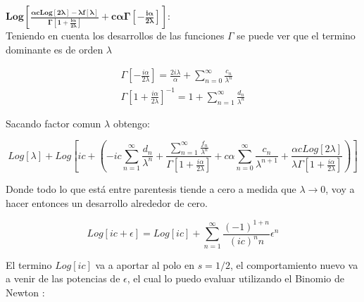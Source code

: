 $\mathbf{
Log[
	\frac{\alpha c Log[2 \lambda] - \lambda f[\lambda] }{\Gamma \left[1 + \frac{i \alpha}{ 2 \lambda} \right] } + 
	c \alpha \Gamma \left[ - \frac{i \alpha}{2 \lambda} \right] ] :
}$ \\

Teniendo en cuenta los desarrollos de las funciones $\Gamma$ se puede ver que el termino dominante es de orden $\lambda$


\begin{equation}
\begin{array}{c}
\Gamma [- \frac{i \alpha}{2 \lambda}] = 
\frac{2 i \lambda}{\alpha}  + 
\sum _{n=0} ^{\infty} \frac{c _n}{\lambda ^n} \\
\Gamma \left[ 1 + \frac{i \alpha}{2 \lambda} \right] ^{-1} = 1 + 
\sum _{n=1} ^{\infty} \frac{d _n}{\lambda ^n}
\end{array}
\end{equation}

Sacando factor comun $\lambda$ obtengo:

\begin{equation}
Log[\lambda] + 
Log \left[
	 i  c +
	\left(
		- i c \sum _{n=1} ^{\infty} \frac{d _n}{\lambda ^n} +
		\frac{\sum _{n=1} ^{\infty} \frac{f _n}{\lambda ^n}}
			 {\Gamma[1+ \frac{i \alpha}{2 \lambda}]}		
		+ c \alpha \sum _{n=0} ^{\infty} \frac{c _n}{\lambda ^{n+1}} +
		\frac{\alpha c Log[2 \lambda]}{\lambda \Gamma [1 + \frac{i \alpha}{2 \lambda} ]}	
		\right)
		\right]		
\end{equation}


Donde todo lo que está entre parentesis tiende a cero a medida que $\lambda \rightarrow 0$, voy a hacer entonces un desarrollo alrededor de cero.

\begin{equation}
Log[i c + \epsilon] =
Log[i c] + 
\sum _{n=1} ^{\infty}
	\frac{(-1) ^{1+n} }
     	{(i c) ^n n}
     \epsilon ^{n}
\end{equation}

El termino $Log[i c]$ va a aportar al polo en $s=1/2$, el comportamiento nuevo va a venir de las potencias de $\epsilon$, el cual lo puedo evaluar utilizando el Binomio de Newton :



